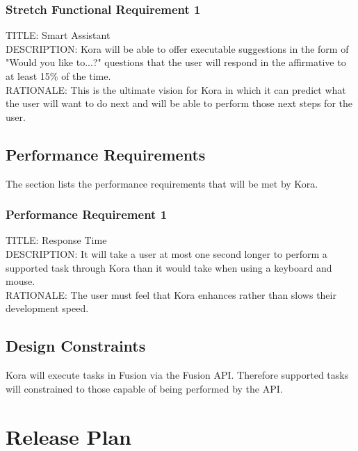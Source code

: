 \documentclass[onecolumn, draftclsnofoot,10pt, compsoc]{IEEEtran}
\def \botname{Kora\xspace}
\begin{document}
        
        \subsubsection{Stretch Functional Requirement 1}
        TITLE: Smart Assistant \\
        DESCRIPTION: \botname will be able to offer executable suggestions in the form of "Would you like to...?" questions that the user will respond in the affirmative to at least 15\% of the time. \\
        RATIONALE: This is the ultimate vision for \botname in which it can predict what the user will want to do next and will be able to perform those next steps for the user. 
        
    \subsection{Performance Requirements}
        The section lists the performance requirements that will be met by \botname.
        
        \subsubsection{Performance Requirement 1}
        TITLE: Response Time \\
        DESCRIPTION: It will take a user at most one second longer to perform a supported task through \botname than it would take when using a keyboard and mouse. \\
        RATIONALE: The user must feel that \botname enhances rather than slows their development speed.
        
    \subsection{Design Constraints}
        \botname will execute tasks in Fusion via the Fusion API. 
        Therefore supported tasks will constrained to those capable of being performed by the API.
        
\section{Release Plan}
\end{document}

